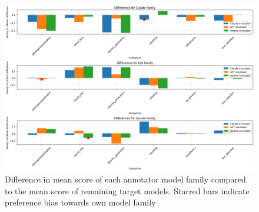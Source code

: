 \documentclass{article} %
\begin{document}
\begin{figure}[!b]
    \centering
    \includegraphics[width=1\textwidth]{mean.png}
    \caption{Difference in mean score of each annotator model family compared to the mean score of remaining target models. Starred bars indicate preference bias towards own model family}
    \label{fig:mean_difference}
\end{figure}
\end{document}

